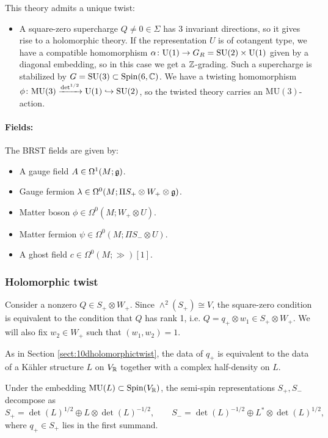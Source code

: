 \documentclass[10pt, oneside]{article}
\newcommand{\MU}{\mathrm{MU}}
\renewcommand{\U}{\mathrm{U}}
\begin{document}
This theory admits a unique twist:
\begin{itemize}
\item A square-zero supercharge $Q\neq 0\in\Sigma$ has 3 invariant directions, so it gives rise to a holomorphic theory. If the representation $U$ is of cotangent type, we have a compatible homomorphism $\alpha\colon \U(1)\rightarrow G_R=\SU(2)\times \U(1)$ given by a diagonal embedding, so in this case we get a $\mathbb Z$-grading. Such a supercharge is stabilized by $G=\mathrm{SU}(3)\subset \mathrm{Spin}(6, \mathbb C)$. We have a twisting homomorphism $\phi\colon\MU(3)\xrightarrow{\det^{1/2}}\U(1)\hookrightarrow \SU(2)$, so the twisted theory carries an $\MU(3)$-action.
\end{itemize}

\vspace{-10pt}
\paragraph{Fields:} The BRST fields are given by:
\begin{itemize}
\item A gauge field $A \in \Omega^1(M;\mathfrak g)$.
\item Gauge fermion $\lambda \in \Omega^0(M; \Pi S_+ \otimes W_+ \otimes \mathfrak g)$. 
\item Matter boson $\phi\in\Omega^0(M; W_+\otimes U)$.
\item Matter fermion $\psi\in\Omega^0(M; \Pi S_-\otimes U)$.
\item A ghost field $c\in \Omega^0(M; \gg)[1]$.
\end{itemize}

\subsubsection{Holomorphic twist}

Consider a nonzero $Q\in S_+\otimes W_+$. Since $\wedge^2(S_+)\cong V$, the square-zero condition is equivalent to the condition that $Q$ has rank 1, i.e. $Q=q_+\otimes w_1\in S_+\otimes W_+$. We will also fix $w_2\in W_+$ such that $(w_1, w_2) = 1$.

As in Section \ref{sect:10dholomorphictwist}, the data of $q_+$ is equivalent to the data of a K\"ahler structure $L$ on $V_\mathbb R$ together with a complex half-density on $L$.

Under the embedding $\MU(L)\subset \Spin(V_\RR)$, the semi-spin representations $S_+, S_-$ decompose as
\[S_+ = \det(L)^{1/2}\oplus L\otimes \det(L)^{-1/2},\qquad S_- = \det(L)^{-1/2} \oplus L^*\otimes \det(L)^{1/2},\]
where $q_+\in S_+$ lies in the first summand.
\end{document}
